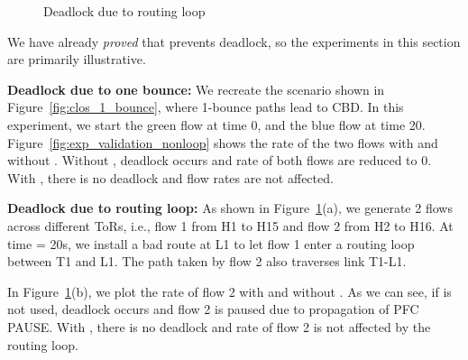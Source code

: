 \begin{figure}[t]
	\centering
	
	
	\caption{Deadlock due to routing loop}\label{fig:exp_validation_loop}
	
\end{figure}

We have already {\em proved} that \sysname{} prevents deadlock, so the
experiments in this section are primarily illustrative. 

\textbf{Deadlock due to one bounce:} We recreate the scenario shown in
Figure~\ref{fig:clos_1_bounce}, where 1-bounce paths lead to CBD.  In this
experiment, we start the green flow at time 0, and the blue flow at time 20.
Figure~\ref{fig:exp_validation_nonloop} shows the rate of the two flows with and
without \sysname{}.  Without \sysname{}, deadlock occurs and rate of both flows
are reduced to 0. With \sysname{}, there is no deadlock and flow rates are not
affected.

\textbf{Deadlock due to routing loop:} As shown in
Figure~\ref{fig:exp_validation_loop}(a), we generate 2 flows across different
ToRs, i.e., flow 1 from H1 to H15 and flow 2 from H2 to H16. At time = 20s, we
install a bad route at L1 to let flow 1 enter a routing loop between T1 and L1.
The path taken by flow 2 also traverses link T1-L1. 

In Figure~\ref{fig:exp_validation_loop}(b), we plot the rate of flow 2 with and
without \sysname{}. As we can see, if \sysname{} is not used, deadlock occurs
and flow 2 is paused due to propagation of PFC PAUSE. With \sysname{}, there is
no deadlock and rate of flow 2 is not affected by the routing loop.

